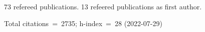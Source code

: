 73 refereed publications. 13 refeered publications as first author.

Total citations~=~2735; h-index~=~28 (2022-07-29)